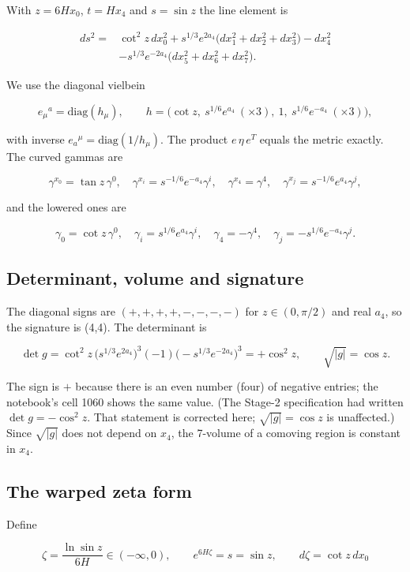 \documentclass[11pt]{article}
\begin{document}
With $z=6Hx_0$, $t=Hx_4$ and $s=\sin z$ the line element is

\[
\begin{aligned}
ds^2={}&\cot^2z\,dx_0^2+s^{1/3}e^{2a_4}\bigl(dx_1^2+dx_2^2+dx_3^2\bigr)-dx_4^2\\
&-s^{1/3}e^{-2a_4}\bigl(dx_5^2+dx_6^2+dx_7^2\bigr).
\end{aligned}
\]

We use the diagonal vielbein

\[
e_\mu{}^a=\mathrm{diag}(h_\mu),\qquad h=\bigl(\cot z,\ s^{1/6}e^{a_4}\ (\times3),\ 1,\ s^{1/6}e^{-a_4}\ (\times3)\bigr),
\]

with inverse $e_a{}^\mu=\mathrm{diag}(1/h_\mu)$. The product $e\,\eta\,e^T$ equals the metric exactly. The curved gammas are

\[
\gamma^{x_0}=\tan z\,\gamma^0,\quad \gamma^{x_i}=s^{-1/6}e^{-a_4}\gamma^i,\quad \gamma^{x_4}=\gamma^4,\quad \gamma^{x_j}=s^{-1/6}e^{a_4}\gamma^j,
\]

and the lowered ones are

\[
\gamma_0=\cot z\,\gamma^0,\quad \gamma_i=s^{1/6}e^{a_4}\gamma^i,\quad \gamma_4=-\gamma^4,\quad \gamma_j=-s^{1/6}e^{-a_4}\gamma^j .
\]

\subsection{Determinant, volume and signature}

The diagonal signs are $(+,+,+,+,-,-,-,-)$ for $z\in(0,\pi/2)$ and real $a_4$, so the signature is (4,4). The determinant is

\[
\det g=\cot^2z\,\bigl(s^{1/3}e^{2a_4}\bigr)^3(-1)\bigl(-s^{1/3}e^{-2a_4}\bigr)^3=+\cos^2z,\qquad \sqrt{|g|}=\cos z .
\]

The sign is $+$ because there is an even number (four) of negative entries; the notebook's cell 1060 shows the same value. (The Stage-2 specification had written $\det g=-\cos^2z$. That statement is corrected here; $\sqrt{|g|}=\cos z$ is unaffected.) Since $\sqrt{|g|}$ does not depend on $x_4$, the 7-volume of a comoving region is constant in $x_4$.

\subsection{The warped zeta form}

Define

\[
\zeta=\frac{\ln\sin z}{6H}\in(-\infty,0),\qquad e^{6H\zeta}=s=\sin z,\qquad d\zeta=\cot z\,dx_0
\]
\end{document}
